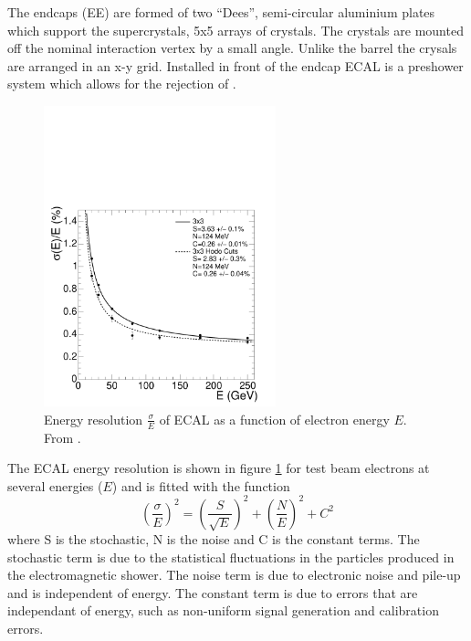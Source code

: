 The endcaps (EE) are formed of two ``Dees'', semi-circular aluminium plates
which support the supercrystals, 5x5 arrays of crystals. The crystals are
mounted off the nominal interaction vertex by a small angle. Unlike the barrel
the crysals are arranged in an x-y grid.
Installed in front of the endcap ECAL is a preshower system which allows for
the rejection of \Ppizero .\cite{cms}

\begin{figure}[htb!]
  \centering
  \includegraphics[width=0.6\textwidth]{ecal_performance}
  \caption{Energy resolution $\frac{\sigma}{E}$ of ECAL as a function of
  \label{fig:ECAL}
electron energy $E$. From \cite{cms}.}
\end{figure}

The ECAL energy resolution is shown in figure \ref{fig:ECAL} for test beam
electrons at several energies ($E$) and is fitted with the function
\begin{equation}
\left(\frac{\sigma}{E}\right)^{2} = \left(\frac{S}{\sqrt{E}}\right)^{2} +
\left(\frac{N}{E}\right)^{2} + C^{2}
\end{equation}
where S is the stochastic, N is the noise and C is the constant terms. The
stochastic term is due to the statistical fluctuations in the particles
produced in the electromagnetic shower. The noise term is due to electronic
noise and pile-up and is independent of energy. The constant term is due to
errors that are independant of energy, such as non-uniform signal generation
and calibration errors.\cite{cms}



